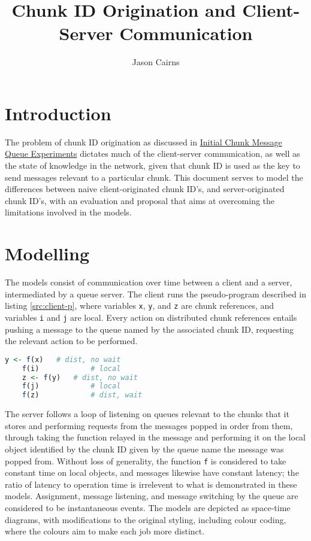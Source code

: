 \documentclass[a4paper,10pt]{article}
\begin{document}
\title{Chunk ID Origination and Client-Server Communication}
\author{Jason Cairns}
  
\maketitle{}

\section{Introduction}

The problem of chunk ID origination as discussed in
\href{init-chunk-msg-q-exp.pdf}{Initial Chunk Message Queue Experiments}
dictates much of the client-server communication, as well as the state of
knowledge in the network, given that chunk ID is used as the key to send
messages relevant to a particular chunk.
This document serves to model the differences between naive client-originated
chunk ID's, and server-originated chunk ID's, with an evaluation and proposal
that aims at overcoming the limitations involved in the models.

\section{Modelling}\label{sec:cid-model}

The models consist of communication over time between a client and a server,
intermediated by a queue server.
The client runs the pseudo-program described in listing \ref{src:client-p},
where variables \texttt{x}, \texttt{y}, and \texttt{z} are chunk references,
and variables \texttt{i} and \texttt{j} are local. 
Every action on distributed chunk references entails pushing a  message to the
queue named by the associated chunk ID, requesting the relevant action to be
performed.

\begin{lstlisting}[language=R, float, 
caption={Modelled Client Program}, label=src:client-p]
	y <- f(x)	# dist, no wait
	f(i)			# local
	z <- f(y)	# dist, no wait
	f(j)			# local
	f(z)			# dist, wait
\end{lstlisting}

The server follows a loop of listening on queues relevant to the chunks that it
stores and performing requests from the messages popped in order from them,
through taking the function relayed in the message and performing it on the
local object identified by the chunk ID given by the queue name the message was
popped from.
Without loss of generality, the function \texttt{f} is considered to take
constant time on local objects, and messages likewise have constant latency;
the ratio of latency to operation time is irrelevent to what is demonstrated in
these models.
Assignment, message listening, and message switching by the queue are
considered to be instantaneous events.
The models are depicted as space-time diagrams, with modifications to the
original styling\cite{lamport1978ordering}, including colour coding, where the
colours aim to make each job more distinct.
\end{document}
